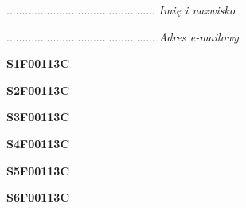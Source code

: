 \begin{turn}{90}\begin{minipage}{\linewidth} \vspace{20mm} ................................................  \textit{Imię i nazwisko}\end{minipage}\end{turn}

\begin{turn}{90}\begin{minipage}{\linewidth} \vspace{20mm} ................................................  \textit{Adres e-mailowy}\end{minipage}\end{turn}

\begin{turn}{90}\huge \begin{minipage}{\linewidth} \vspace{10mm}\textbf{S1F00113C}\end{minipage}\end{turn}

\begin{turn}{90}\huge \begin{minipage}{\linewidth} \vspace{10mm}\textbf{S2F00113C}\end{minipage}\end{turn}

\begin{turn}{90}\huge \begin{minipage}{\linewidth} \vspace{10mm}\textbf{S3F00113C}\end{minipage}\end{turn}

\begin{turn}{90}\huge \begin{minipage}{\linewidth} \vspace{10mm}\textbf{S4F00113C}\end{minipage}\end{turn}

\begin{turn}{90}\huge \begin{minipage}{\linewidth} \vspace{10mm}\textbf{S5F00113C}\end{minipage}\end{turn}

\begin{turn}{90}\huge \begin{minipage}{\linewidth} \vspace{10mm}\textbf{S6F00113C}\end{minipage}\end{turn}

